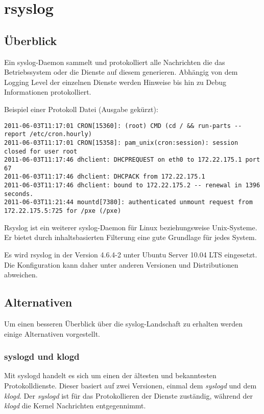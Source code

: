 \section{rsyslog}
\subsection{Überblick}
Ein syslog-Daemon sammelt und protokolliert alle Nachrichten die das Betriebssystem oder die Dienste auf diesem generieren. Abhängig von dem Logging Level der einzelnen Dienste werden Hinweise bis hin zu Debug Informationen protokolliert.

Beispiel einer Protokoll Datei (Ausgabe gekürzt):
\begin{lstlisting}
2011-06-03T11:17:01 CRON[15360]: (root) CMD (cd / && run-parts --report /etc/cron.hourly)
2011-06-03T11:17:01 CRON[15358]: pam_unix(cron:session): session closed for user root
2011-06-03T11:17:46 dhclient: DHCPREQUEST on eth0 to 172.22.175.1 port 67
2011-06-03T11:17:46 dhclient: DHCPACK from 172.22.175.1
2011-06-03T11:17:46 dhclient: bound to 172.22.175.2 -- renewal in 1396 seconds.
2011-06-03T11:21:44 mountd[7380]: authenticated unmount request from 172.22.175.5:725 for /pxe (/pxe)
\end{lstlisting}

Rsyslog ist ein weiterer syslog-Daemon für Linux beziehungsweise Unix-Systeme. Er bietet durch inhaltsbasierten Filterung eine gute Grundlage für jedes System.

\begin{importantnote}
	Es wird rsyslog in der Version 4.6.4-2 unter Ubuntu Server 10.04 LTS eingesetzt. 
	Die Konfiguration kann daher unter anderen Versionen und Distributionen abweichen.
\end{importantnote}

\subsection{Alternativen}
Um einen besseren Überblick über die syslog-Landschaft zu erhalten werden einige Alternativen vorgestellt.

\subsubsection*{syslogd und klogd}
Mit syslogd handelt es sich um einen der ältesten und bekanntesten Protokolldienste. \cite{GentooProtokollierung} Dieser basiert auf zwei Versionen, einmal dem \textit{syslogd} und dem \textit{klogd}. Der \textit{syslogd} ist für das Protokollieren der Dienste zuständig, während der \textit{klogd} die Kernel Nachrichten entgegennimmt. \cite{AboutSyslogd}


